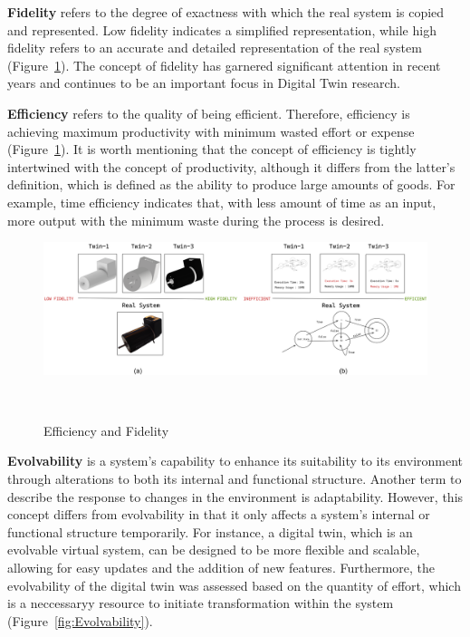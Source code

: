 \documentclass{llncs}
\begin{document}
    \textbf{Fidelity} refers to the degree of exactness with which the real system is copied and represented. 
    Low fidelity indicates a simplified representation, 
    while high fidelity refers to an accurate and detailed representation of the real system~\cite{Review2} (Figure~\ref{fig:EfficiencyandFidelity}). 
    The concept of fidelity has garnered significant attention in recent
    years and continues to be an important focus in Digital Twin research\cite{Review2}\cite{Review1}.

    \textbf{Efficiency} refers to the quality of being efficient\cite{OxfordDictionary}. 
    Therefore, efficiency is achieving maximum productivity with minimum wasted effort or expense (Figure~\ref{fig:EfficiencyandFidelity}). 
    It is worth mentioning that the concept of efficiency is tightly intertwined with the concept of productivity, 
    although it differs from the latter's definition, which is defined as the ability to produce large amounts of goods\cite{OxfordDictionary}.  
    For example, time efficiency indicates that,  with less amount of time as an input, more output with the minimum waste during the process is desired.
    
    \begin{figure}[htbp]
        \centering
        \includegraphics[width = 1\textwidth]{Efficiency and Fidelity.png}
        \caption{Efficiency and Fidelity}~\label{fig:EfficiencyandFidelity}
    \end{figure}
 
    \textbf{Evolvability} is a system's capability to enhance its suitability to its environment through alterations to both its internal and functional 
    structure\cite{MobusSystemTheory}. Another term to describe the response to changes in the environment is adaptability.
    However, this concept differs from evolvability in that it only affects a system's internal or functional structure temporarily. 
    For instance, a digital twin, which is an evolvable virtual system, can be designed to be more flexible and scalable, 
    allowing for easy updates and the addition of new features\cite{ZHANGUPDATEMETHOD}. 
    Furthermore, the evolvability of the digital twin was assessed based on the quantity of effort, which is a neccessaryy resource to initiate transformation
    within the system (Figure~\ref{fig:Evolvability}). 
\end{document}

